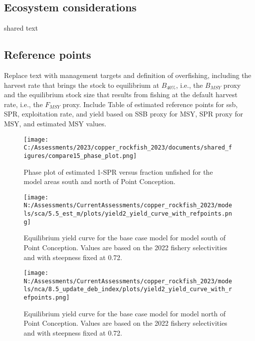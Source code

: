 \documentclass[11pt,
  english,
  letterpaper,
]{article}
\begin{document}
\hypertarget{ecosystem-considerations}{%
\subsection*{Ecosystem considerations}\label{ecosystem-considerations}}

shared text

\hypertarget{reference-points}{%
\subsection*{Reference points}\label{reference-points}}

Replace text with management targets and definition of overfishing, including the harvest rate that brings the stock to equilibrium at \(B_{40\%}\), i.e., the \(B_{MSY}\) proxy and the equilibrium stock size that results from fishing at the default harvest rate, i.e., the \(F_{MSY}\) proxy. Include Table of estimated reference points for ssb, SPR, exploitation rate, and yield based on SSB proxy for MSY, SPR proxy for MSY, and estimated MSY values.





\begin{figure}
\centering
\texttt{[image: C:/Assessments/2023/copper\_rockfish\_2023/documents/shared\_figures/compare15\_phase\_plot.png]}
\caption{Phase plot of estimated 1-SPR versus fraction unfished for the model areas south and north of Point Conception.\label{fig:es-phase}}
\end{figure}

\begin{figure}
\centering
\texttt{[image: N:/Assessments/CurrentAssessments/copper\_rockfish\_2023/models/sca/5.5\_est\_m/plots/yield2\_yield\_curve\_with\_refpoints.png]}
\caption{Equilibrium yield curve for the base case model for model south of Point Conception. Values are based on the 2022 fishery selectivities and with steepness fixed at 0.72.\label{fig:south-es-yield}}
\end{figure}

\begin{figure}
\centering
\texttt{[image: N:/Assessments/CurrentAssessments/copper\_rockfish\_2023/models/nca/8.5\_update\_deb\_index/plots/yield2\_yield\_curve\_with\_refpoints.png]}
\caption{Equilibrium yield curve for the base case model for model north of Point Conception. Values are based on the 2022 fishery selectivities and with steepness fixed at 0.72.\label{fig:north-es-yield}}
\end{figure}
\end{document}
